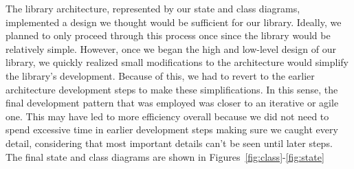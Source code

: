 The library architecture, represented by our state and class diagrams, implemented a design we thought would be sufficient for our library. Ideally, we planned to only proceed through this process once since the library would be relatively simple. However, once we began the high and low-level design of our library, we quickly realized small modifications to the architecture would simplify the library's development. Because of this, we had to revert to the earlier architecture development steps to make these simplifications. In this sense, the final development pattern that was employed was closer to an iterative or agile one. This may have led to more efficiency overall because we did not need to spend excessive time in earlier development steps making sure we caught every detail, considering that most important details can't be seen until later steps. The final state and class diagrams are shown in Figures~\ref{fig:class}-\ref{fig:state}

